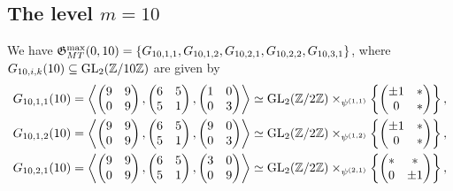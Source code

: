 \medskip

\subsection{The level \texorpdfstring{$m = 10$}.}

We have $\mathfrak{G}_{MT}^{\max}(0,10) = \{ G_{10,1,1}, G_{10,1,2}, G_{10,2,1}, G_{10,2,2}, G_{10,3,1} \}$, where $G_{10,i,k}(10) \subseteq \operatorname{GL}_2(\mathbb{Z}/10\mathbb{Z})$ are given by
\begin{equation} \label{descriptionofgroupslevel10}
\begin{split}
G_{10,1,1}(10) &= \left\langle \begin{pmatrix} 9 & 9 \\ 0 & 9 \end{pmatrix}, \begin{pmatrix} 6 & 5 \\ 5 & 1 \end{pmatrix}, \begin{pmatrix} 1 & 0 \\ 0 & 3 \end{pmatrix} \right\rangle \simeq \GL_2(\mbz/2\mbz) \times_{\psi^{(1,1)}} \left\{ \begin{pmatrix} \pm 1 & * \\ 0 & * \end{pmatrix} \right\}, \\
G_{10,1,2}(10) &= \left\langle \begin{pmatrix} 9 & 9 \\ 0 & 9 \end{pmatrix}, \begin{pmatrix} 6 & 5 \\ 5 & 1 \end{pmatrix}, \begin{pmatrix} 9 & 0 \\ 0 & 3 \end{pmatrix} \right\rangle \simeq \GL_2(\mbz/2\mbz) \times_{\psi^{(1,2)}} \left\{ \begin{pmatrix} \pm 1 & * \\ 0 & * \end{pmatrix} \right\}, \\
G_{10,2,1}(10) &= \left\langle \begin{pmatrix} 9 & 9 \\ 0 & 9 \end{pmatrix}, \begin{pmatrix} 6 & 5 \\ 5 & 1 \end{pmatrix}, \begin{pmatrix} 3 & 0 \\ 0 & 9 \end{pmatrix} \right\rangle \simeq \GL_2(\mbz/2\mbz) \times_{\psi^{(2,1)}} \left\{ \begin{pmatrix} * & * \\ 0 & \pm 1 \end{pmatrix} \right\}, \\

\end{split}
\end{equation}
